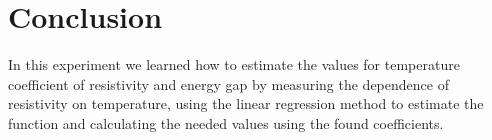 \section{Conclusion}
In this experiment we learned how to estimate the values for temperature coefficient of resistivity and energy gap by measuring the dependence of resistivity on temperature, using the linear regression method to estimate the function and calculating the needed values using the found coefficients.